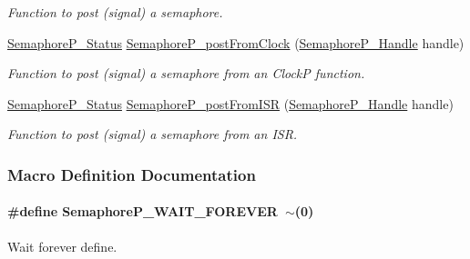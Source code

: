 \begin{DoxyCompactItemize}
\begin{DoxyCompactList}\small\item\em Function to post (signal) a semaphore. \end{DoxyCompactList}\item 
\hyperlink{_semaphore_p_8h_a5d4aebe0ebff4aaadba07d853ae4ee42}{Semaphore\+P\+\_\+\+Status} \hyperlink{_semaphore_p_8h_a6a58e4829dfd28d4059b96adc44bb918}{Semaphore\+P\+\_\+post\+From\+Clock} (\hyperlink{_semaphore_p_8h_a7f34865f33e666455692544e5f12d1f2}{Semaphore\+P\+\_\+\+Handle} handle)
\begin{DoxyCompactList}\small\item\em Function to post (signal) a semaphore from an Clock\+P function. \end{DoxyCompactList}\item 
\hyperlink{_semaphore_p_8h_a5d4aebe0ebff4aaadba07d853ae4ee42}{Semaphore\+P\+\_\+\+Status} \hyperlink{_semaphore_p_8h_abec3ab7b2ea4767f77d133f05fce2378}{Semaphore\+P\+\_\+post\+From\+I\+S\+R} (\hyperlink{_semaphore_p_8h_a7f34865f33e666455692544e5f12d1f2}{Semaphore\+P\+\_\+\+Handle} handle)
\begin{DoxyCompactList}\small\item\em Function to post (signal) a semaphore from an I\+S\+R. \end{DoxyCompactList}\end{DoxyCompactItemize}


\subsubsection{Macro Definition Documentation}
\paragraph[{Semaphore\+P\+\_\+\+W\+A\+I\+T\+\_\+\+F\+O\+R\+E\+V\+E\+R}]{\setlength{\rightskip}{0pt plus 5cm}\#define Semaphore\+P\+\_\+\+W\+A\+I\+T\+\_\+\+F\+O\+R\+E\+V\+E\+R~$\sim$(0)}\label{_semaphore_p_8h_a6d1991df030b91d441c8bc886739c29d}


Wait forever define. 


